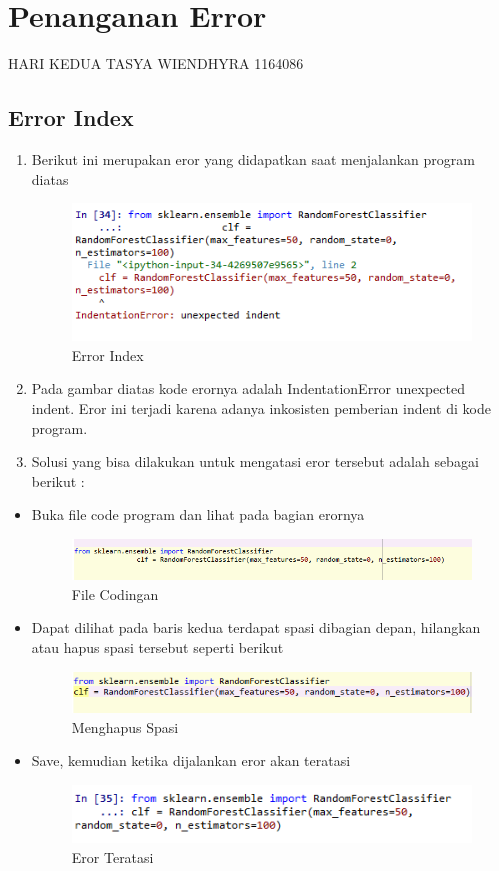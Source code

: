 \section{Penanganan Error}
HARI KEDUA TASYA WIENDHYRA 1164086
\subsection{Error Index}
\begin{enumerate}
	\item
Berikut ini merupakan eror yang didapatkan saat menjalankan program diatas
\begin{figure}[ht]
\centering
\includegraphics[scale=0.5]{figures/eror3.png}
\caption{Error Index}
\label{Error}
\end{figure}
	\item
Pada gambar diatas kode erornya adalah IndentationError unexpected indent. Eror ini terjadi karena adanya inkosisten pemberian indent di kode program.
	\item
Solusi yang bisa dilakukan untuk mengatasi eror tersebut adalah sebagai berikut : 
\end{enumerate}
\begin{itemize}
\item
Buka file code program dan lihat pada bagian erornya
\begin{figure}[ht]
\centering
\includegraphics[scale=0.5]{figures/solusi9.png}
\caption{File Codingan}
\label{Eror}
\end{figure}
\item
Dapat dilihat pada baris kedua terdapat spasi dibagian depan, hilangkan atau hapus spasi tersebut seperti berikut 
\begin{figure}[ht]
\centering
\includegraphics[scale=0.5]{figures/solusi10.png}
\caption{Menghapus Spasi}
\label{Eror}
\end{figure}
\item Save, kemudian ketika dijalankan eror akan teratasi
\begin{figure}[ht]
\centering
\includegraphics[scale=0.5]{figures/solusi11.png}
\caption{Eror Teratasi}
\label{Eror}
\end{figure}
\end{itemize}

